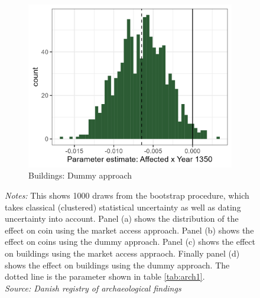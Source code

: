 \documentclass[11pt]{article}
\begin{document}
\begin{figure}[h!]
\begin{subfigure}[b]{0.45\textwidth}
        \centering
        \caption{\label{fig:distri_d} Buildings: Dummy approach}
        \includegraphics[width=\textwidth]{Plots/Regression_plots/arch_dummy_buildings_boot.png}
    \end{subfigure}
    \parbox{0.9\textwidth}{
    \caption*{\footnotesize \textit{Notes:} This shows 1000 draws from the bootstrap procedure, which takes classical (clustered) statistical uncertainty as well as dating uncertainty into account. Panel (a) shows the distribution of the effect on coin using the market access approach. Panel (b) shows the effect on coins using the dummy approach. Panel (c) shows the effect on buildings using the market access appraoch. Finally panel (d) shows the effect on buildings using the dummy approach. The dotted line is the parameter shown in table \ref{tab:arch1}. \\ \textit{Source: Danish registry of archaeological findings}}
}
    \label{fig:arch_reg_boot}
\end{figure}
\end{document}
